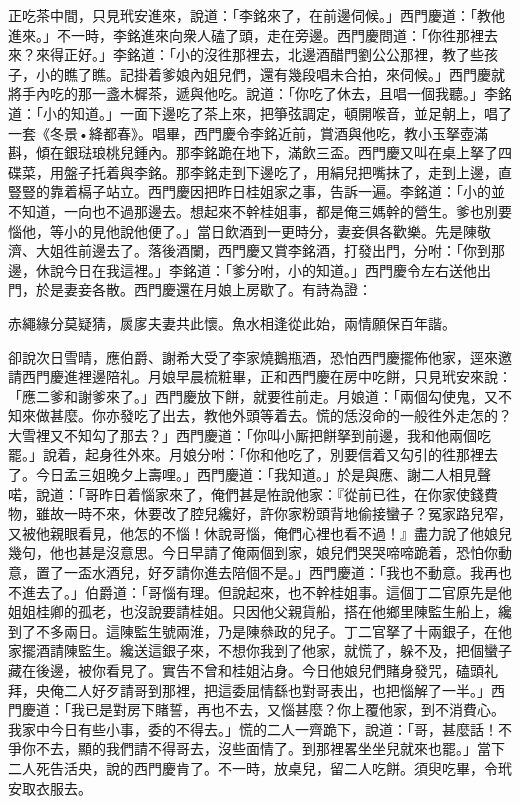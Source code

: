 正吃茶中間，只見玳安進來，說道：「李銘來了，在前邊伺候。」西門慶道：「教他進來。」不一時，李銘進來向衆人磕了頭，走在旁邊。西門慶問道：「你徃那裡去來？來得正好。」李銘道：「小的沒徃那裡去，北邊酒醋門劉公公那裡，教了些孩子，小的瞧了瞧。記掛着爹娘內姐兒們，還有幾段唱未合拍，來伺候。」西門慶就將手內吃的那一盞木樨茶，遞與他吃。說道：「你吃了休去，且唱一個我聽。」李銘道：「小的知道。」一面下邊吃了茶上來，把箏弦調定，頓開喉音，並足朝上，唱了一套《冬景•絳都春》。唱畢，西門慶令李銘近前，賞酒與他吃，教小玉拏壺滿斟，傾在銀琺琅桃兒鍾內。那李銘跪在地下，滿飲三盃。西門慶又叫在桌上拏了四碟菜，用盤子托着與李銘。那李銘走到下邊吃了，用絹兒把嘴抹了，走到上邊，直豎豎的靠着槅子站立。西門慶因把昨日桂姐家之事，告訴一遍。李銘道：「小的並不知道，一向也不過那邊去。想起來不幹桂姐事，都是俺三媽幹的營生。{}爹也別要惱他，等小的見他說他便了。」當日飲酒到一更時分，妻妾俱各歡樂。先是陳敬濟、大姐徃前邊去了。落後酒闌，西門慶又賞李銘酒，打發出門，分咐：「你到那邊，休說今日在我這裡。」李銘道：「爹分咐，小的知道。」西門慶令左右送他出門，於是妻妾各散。西門慶還在月娘上房歇了。有詩為證：

赤繩緣分莫疑猜，扊扅夫妻共此懷。魚水相逢從此始，兩情願保百年諧。

卻說次日雪晴，應伯爵、謝希大受了李家燒鵝瓶酒，恐怕西門慶擺佈他家，逕來邀請西門慶進裡邊陪礼。月娘早晨梳粧畢，正和西門慶在房中吃餅，只見玳安來說：「應二爹和謝爹來了。」西門慶放下餅，就要徃前走。月娘道：「兩個勾使鬼，又不知來做甚麼。你亦發吃了出去，教他外頭等着去。慌的恁沒命的一般徃外走怎的？大雪裡又不知勾了那去？」西門慶道：「你叫小厮把餅拏到前邊，我和他兩個吃罷。」說着，起身徃外來。月娘分咐：「你和他吃了，別要信着又勾引的徃那裡去了。今日孟三姐晚夕上壽哩。」西門慶道：「我知道。」於是與應、謝二人相見聲喏，說道：「哥昨日着惱家來了，俺們甚是恠說他家：『從前已徃，在你家使錢費物，雖故一時不來，休要改了腔兒纔好，許你家粉頭背地偷接蠻子？冤家路兒窄，又被他親眼看見，他怎的不惱！休說哥惱，俺們心裡也看不過！』盡力說了他娘兒幾句，他也甚是沒意思。今日早請了俺兩個到家，娘兒們哭哭啼啼跪着，恐怕你動意，置了一盃水酒兒，好歹請你進去陪個不是。」{}西門慶道：「我也不動意。我再也不進去了。」伯爵道：「哥惱有理。但說起來，也不幹桂姐事。這個丁二官原先是他姐姐桂卿的孤老，也沒說要請桂姐。只因他父親貨船，搭在他鄉里陳監生船上，纔到了不多兩日。這陳監生號兩淮，乃是陳叅政的兒子。丁二官拏了十兩銀子，在他家擺酒請陳監生。纔送這銀子來，不想你我到了他家，就慌了，躲不及，把個蠻子藏在後邊，被你看見了。實告不曾和桂姐沾身。今日他娘兒們賭身發咒，磕頭礼拜，央俺二人好歹請哥到那裡，把這委屈情繇也對哥表出，也把惱解了一半。」西門慶道：「我已是對房下賭誓，再也不去，又惱甚麼？你上覆他家，到不消費心。我家中今日有些小事，委的不得去。」慌的二人一齊跪下，{}說道：「哥，甚麼話！不爭你不去，顯的我們請不得哥去，沒些面情了。到那裡畧坐坐兒就來也罷。」當下二人死告活央，說的西門慶肯了。不一時，放桌兒，留二人吃餅。須臾吃畢，令玳安取衣服去。

